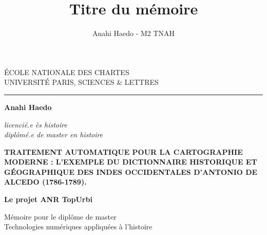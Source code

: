 \documentclass[a4paper,12pt,twoside]{book}
\author{Anahi Haedo - M2 TNAH}
\title{Titre du mémoire}
\begin{document}
	\begin{titlepage}
		\begin{center}
			
			\bigskip
			
			\begin{large}				
				ÉCOLE NATIONALE DES CHARTES\\
				UNIVERSITÉ PARIS, SCIENCES \& LETTRES
			\end{large}
			\begin{center}\rule{2cm}{0.02cm}\end{center}
			
			\bigskip
			\bigskip
			\bigskip
			\begin{Large}
				\textbf{Anahi Haedo}\\
			\end{Large}
			\begin{normalsize} \textit{licencié.e ès histoire}\\
				\textit{diplômé.e de master en histoire}
			\end{normalsize}
			
			\bigskip
			\bigskip
			\bigskip
			
			\begin{Huge}
				\textbf{TRAITEMENT AUTOMATIQUE POUR LA CARTOGRAPHIE MODERNE : L’EXEMPLE DU DICTIONNAIRE HISTORIQUE ET GÉOGRAPHIQUE DES INDES OCCIDENTALES D’ANTONIO DE ALCEDO (1786-1789).}\\
			\end{Huge}
			\bigskip
			\bigskip
			\begin{LARGE}
				\textbf{Le projet ANR TopUrbi}\\
			\end{LARGE}
			
			\bigskip
			\bigskip
			\bigskip
			\begin{large}
			\end{large}
			\vfill
			
			\begin{large}
				Mémoire 
				pour le diplôme de master \\
				\og{} Technologies numériques appliquées à l'histoire \fg{} \\
			\end{large}
			
		\end{center}
	\end{titlepage}
	
	\thispagestyle{empty}	
	\cleardoublepage
	
\end{document}
